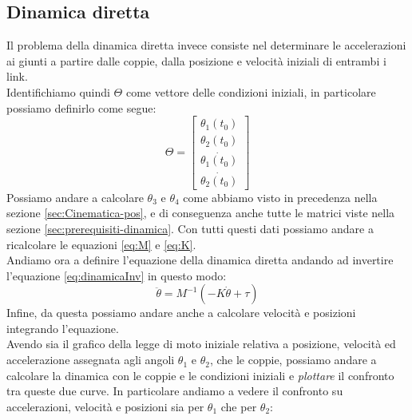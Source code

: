 \subsection{Dinamica diretta}
Il problema della dinamica diretta invece consiste nel determinare le accelerazioni ai giunti a partire dalle coppie, dalla posizione e velocità iniziali di entrambi i link.
\\Identifichiamo quindi $\Theta$ come vettore delle condizioni iniziali, in particolare possiamo definirlo come segue:
\begin{equation*}
    \Theta = \begin{bmatrix}
    \theta_1(t_0) \\ \theta_2(t_0) \\ \dot{\theta_1(t_0)} \\ \dot{\theta_2(t_0)}
    \end{bmatrix}
\end{equation*}
Possiamo andare a calcolare $\theta_3$ e $\theta_4$ come abbiamo visto in precedenza nella sezione \ref{sec:Cinematica-pos}, e di conseguenza anche tutte le matrici viste nella sezione \ref{sec:prerequisiti-dinamica}. Con tutti questi dati possiamo andare a ricalcolare le equazioni \ref{eq:M} e \ref{eq:K}. 
\\Andiamo ora a definire l'equazione della dinamica diretta andando ad invertire l'equazione \ref{eq:dinamicaInv} in questo modo:
\begin{equation}
    \ddot{\theta} = M^{-1}(-K\dot{\theta}+\tau)
    \label{eq:dinamicaDiretta}
\end{equation}
Infine, da questa possiamo andare anche a calcolare velocità e posizioni integrando l'equazione.
\\Avendo sia il grafico della legge di moto iniziale relativa a posizione, velocità ed accelerazione assegnata agli angoli $\theta_1$ e $\theta_2$, che le coppie, possiamo andare a calcolare la dinamica con le coppie e le condizioni iniziali e \textit{plottare} il confronto tra queste due curve. In particolare andiamo a vedere il confronto su accelerazioni, velocità e posizioni sia per $\theta_1$ che per $\theta_2$: 

